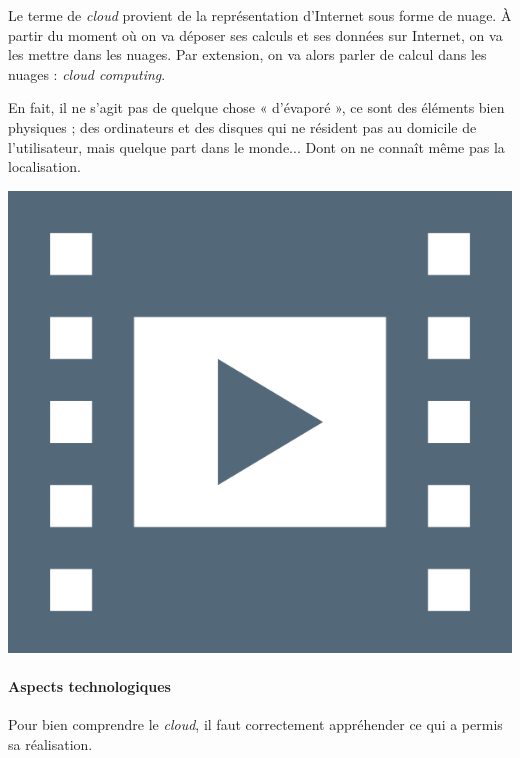Le terme de \textit{cloud} provient de la représentation d'Internet sous forme de nuage. À partir du moment où on va déposer ses calculs et ses données sur Internet, on va les mettre dans les nuages. Par extension, on va alors parler de calcul dans les nuages : \textit{cloud computing}.

En fait, il ne s'agit pas de quelque chose « d'évaporé », ce sont des éléments bien physiques ; des ordinateurs et des disques qui ne résident pas au domicile de l'utilisateur, mais quelque part dans le monde... Dont on ne connaît même pas la localisation.

\begin{marginvideo}
	\href{https://www.youtube.com/watch?v=5YawCCUxa_E&list=PLWvGMqXvyJAMNWRvODUB5Ry3licACdaa0&index=13}%
		{\includegraphics[width=\marginparwidth]{./Images/Pictograms/film-strip-dark-electric-blue.png}}%
\end{marginvideo}

\paragraph*{Aspects technologiques} Pour bien comprendre le \textit{cloud}, il faut correctement appréhender ce qui a permis sa réalisation. 

